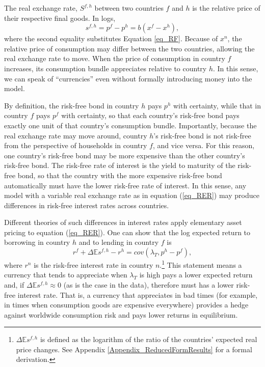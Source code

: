\documentclass{ar-1col}
\begin{document}
The real exchange rate, $S^{f, h}$ between two countries $f$ and $h$ is the relative price of their respective final goods. In logs,
\begin{equation}
  s^{f,h} 
  = p^f - p^h 
  = b(x^f - x^h),
\label{eq_RER}
\end{equation}
where the second equality substitutes Equation \eqref{eq_RF}. Because of $x^{n}$, the relative price of consumption may differ between the two countries, allowing the real exchange rate to move. When the price of consumption in country $f$ increases, its consumption bundle appreciates relative to country $h$. In this sense, we can speak of ``currencies'' even without formally introducing money into the model.

By definition, the risk-free bond in country $h$ pays $p^h$ with certainty, while that in country $f$ pays $p^f$ with certainty, so that each country's risk-free bond pays exactly one unit of that country's consumption bundle. Importantly, because the real exchange rate may move around, country $h$'s risk-free bond is not risk-free from the perspective of households in country $f$, and vice versa. For this reason, one country's risk-free bond may be more expensive than the other country's risk-free bond. The risk-free rate of interest is the yield to maturity of the risk-free bond, so that the country with the more expensive risk-free bond automatically must have the lower risk-free rate of interest. In this sense, any model with a variable real exchange rate as in equation (\ref{eq_RER}) may produce differences in risk-free interest rates across countries.

Different theories of such differences in interest rates apply elementary asset pricing to equation (\ref{eq_RER}). One can show that the log expected return to borrowing in country $h$ and to lending in country $f$ is
\begin{equation}
  r^{f} + \Delta \mathbb{E} s^{f,h} - r^{h} 
  = cov\left( \lambda _{T},p^{h}-p^{f}\right),
  \label{eq_UIP_RF}
\end{equation}%
where $r^{n}$ is the risk-free interest rate in country $n$.\footnote{$\Delta\mathbb{E}s^{f,h}$ is defined as the logarithm of the ratio of the countries' expected real price changes. See Appendix \ref{Appendix_ReducedFormResults} for a formal derivation.} This statement means a currency that tends to appreciate when $\lambda_T$ is high pays a lower expected return and, if $\Delta \mathbb{E} s^{f,h}\approx0$ (as is the case in the data), therefore must has a lower risk-free interest rate. That is, a currency that appreciates in bad times (for example, in times when consumption goods are expensive everywhere) provides a hedge against worldwide consumption risk and pays lower returns in equilibrium.
\end{document}
